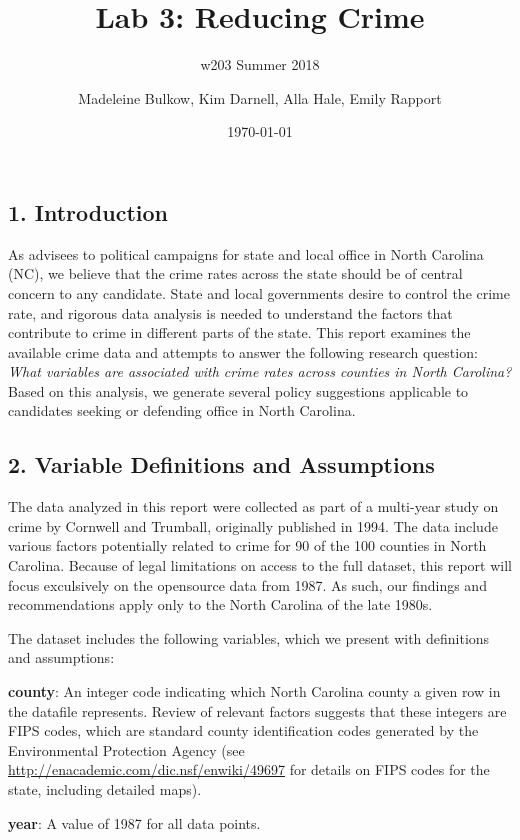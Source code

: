 \documentclass[]{article}
\title{Lab 3: Reducing Crime}
\subtitle{w203 Summer 2018}
\author{Madeleine Bulkow, Kim Darnell, Alla Hale, Emily Rapport}
\date{\today}
\begin{document}
\maketitle

\subsection{1. Introduction}\label{introduction}

As advisees to political campaigns for state and local office in North
Carolina (NC), we believe that the crime rates across the state should
be of central concern to any candidate. State and local governments
desire to control the crime rate, and rigorous data analysis is needed
to understand the factors that contribute to crime in different parts of
the state. This report examines the available crime data and attempts to
answer the following research question: \emph{What variables are
associated with crime rates across counties in North Carolina?} Based on
this analysis, we generate several policy suggestions applicable to
candidates seeking or defending office in North Carolina.

\subsection{2. Variable Definitions and
Assumptions}\label{variable-definitions-and-assumptions}

The data analyzed in this report were collected as part of a multi-year
study on crime by Cornwell and Trumball, originally published in 1994.
The data include various factors potentially related to crime for 90 of
the 100 counties in North Carolina. Because of legal limitations on
access to the full dataset, this report will focus exculsively on the
opensource data from 1987. As such, our findings and recommendations
apply only to the North Carolina of the late 1980s.

The dataset includes the following variables, which we present with
definitions and assumptions:

\textbf{county}: An integer code indicating which North Carolina county
a given row in the datafile represents. Review of relevant factors
suggests that these integers are FIPS codes, which are standard county
identification codes generated by the Environmental Protection Agency
(see \url{http://enacademic.com/dic.nsf/enwiki/49697} for details on
FIPS codes for the state, including detailed maps).

\textbf{year}: A value of 1987 for all data points.
\end{document}
